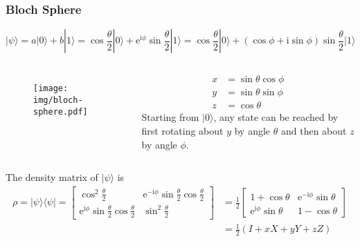 \documentclass[UTF8,11pt,colorlinks,compress,openany]{beamer}%
\begin{document}
\begin{frame}\frametitle{Bloch Sphere}
\setlength\abovedisplayskip{0pt}
\setlength\belowdisplayskip{0pt}
\[|\psi\rangle=a|0\rangle+b|1\rangle=\cos\frac{\theta}{2}|0\rangle+\mathrm{e}^{\mathrm{i}\phi}\sin\frac{\theta}{2}|1\rangle=\cos\frac{\theta}{2}|0\rangle+(\cos\phi+\mathrm{i}\sin\phi)\sin\frac{\theta}{2}|1\rangle\]\vspace*{-2ex}
\begin{columns}
	\begin{figure}[H]
		\texttt{[image: img/bloch-sphere.pdf]}
	\end{figure}
\begin{align*}
	x&=\sin\theta\cos\phi\\
	y&=\sin\theta\sin\phi\\
	z&=\cos\theta
\end{align*}
Starting from $|0\rangle$, any state can be reached by first rotating about $y$ by angle $\theta$ and then about $z$ by angle $\phi$.
\end{columns}
The density matrix of $|\psi\rangle$ is
\begin{align*}
\rho=|\psi\rangle\langle\psi|=
\begin{bmatrix}
	\cos^2\frac{\theta}{2} &\mathrm{e}^{-\mathrm{i}\phi}\sin\frac{\theta}{2}\cos\frac{\theta}{2}\\
	\mathrm{e}^{\mathrm{i}\phi}\sin\frac{\theta}{2}\cos\frac{\theta}{2} &\sin^2\frac{\theta}{2}
\end{bmatrix}&=\frac{1}{2}
\begin{bmatrix}
	1+\cos\theta &\mathrm{e}^{-\mathrm{i}\phi}\sin\theta\\
	\mathrm{e}^{\mathrm{i}\phi}\sin\theta &1-\cos\theta
\end{bmatrix}\\&=\frac{1}{2}(I+xX+yY+zZ)
\end{align*}
\end{frame}
\end{document}
